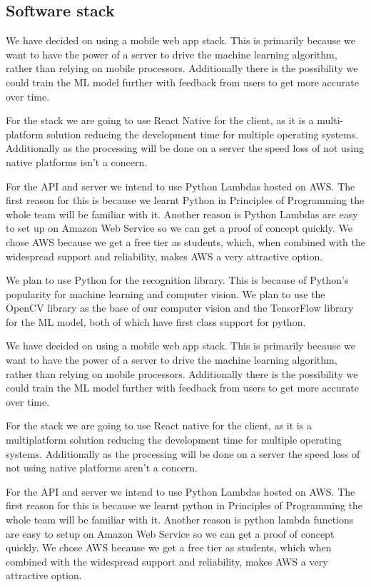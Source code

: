 \documentclass[10pt]{article}
\begin{document}
\subsection{Software stack}

We have decided on using a mobile web app stack. This is primarily because we want to have the power 
of a server to drive the machine learning algorithm, rather than relying on mobile processors. 
Additionally there is the possibility we could train the ML model further with feedback from users 
to get more accurate over time.

For the stack we are going to use React Native for the client, as it is a multi-platform solution 
reducing the development time for multiple operating systems. Additionally as the processing will be 
done on a server the speed loss of not using native platforms isn't a concern.

For the API and server we intend to use Python Lambdas hosted on AWS. The first reason for this is 
because we learnt Python in Principles of Programming the whole team will be familiar with it. 
Another reason is Python Lambdas are easy to set up on Amazon Web Service so we can get a proof of 
concept quickly. We chose AWS because we get a free tier as students, which, when combined with the 
widespread support and reliability, makes AWS a very attractive option.

We plan to use Python for the recognition library. This is because of Python's popularity for 
machine learning and computer vision. We plan to use the OpenCV library as the base of our computer 
vision and the TensorFlow library for the ML model, both of which have first class support for 
python.

We have decided on using a mobile web app stack. This is primarily because we want to have the 
power of a server to drive the machine learning algorithm, rather than relying on mobile 
processors. Additionally there is the possibility we could train the ML model further with 
feedback from users to get more accurate over time.

For the stack we are going to use React native for the client, as it is a multiplatform solution 
reducing the development time for multiple operating systems. Additionally as the processing will 
be done on a server the speed loss of not using native platforms aren't a concern.

For the API and server we intend to use Python Lambdas hosted on AWS. The first reason for this is 
because we learnt python in Principles of Programming the whole team will be familiar with it. 
Another reason is python lambda functions are easy to setup on Amazon Web Service so we can get a 
proof of concept quickly. We chose AWS because we get a free tier as students, which when combined 
with the widespread support and reliability, makes AWS a very attractive option.
\end{document}
